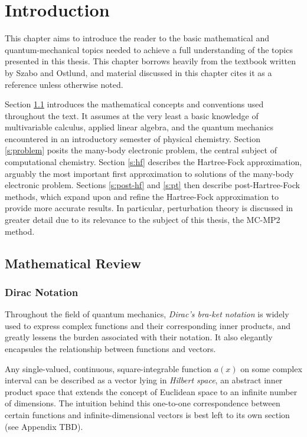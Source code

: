 \chapter{Introduction}

This chapter aims to introduce the reader to the basic mathematical and
quantum-mechanical topics needed to achieve a full understanding of the topics
presented in this thesis. This chapter borrows heavily from the textbook written
by Szabo and Ostlund, and material discussed in this chapter cites it as a
reference unless otherwise noted. \cite{szabo}

Section \ref{s:math} introduces the mathematical concepts and conventions used
throughout the text. It assumes at the very least a basic knowledge of
multivariable calculus, applied linear algebra, and the quantum mechanics
encountered in an introductory semester of physical chemistry. Section
\ref{s:problem} posits the many-body electronic problem, the central subject of
computational chemistry. Section \ref{s:hf} describes the Hartree-Fock
approximation, arguably the most important first approximation to solutions of
the many-body electronic problem. Sections \ref{s:post-hf} and \ref{s:pt} then
describe post-Hartree-Fock methods, which expand upon and refine the
Hartree-Fock approximation to provide more accurate results. In particular,
perturbation theory is discussed in greater detail due to its relevance to the
subject of this thesis, the MC-MP2 method.

\section{Mathematical Review}
\label{s:math}

\subsection{Dirac Notation}

Throughout the field of quantum mechanics, \emph{Dirac's bra-ket notation} is
widely used to express complex functions and their corresponding inner products,
and greatly lessens the burden associated with their notation. It also elegantly
encapsules the relationship between functions and vectors.

Any single-valued, continuous, square-integrable function $a(x)$ on some complex
interval can be described as a vector lying in \emph{Hilbert space}, an abstract
inner product space that extends the concept of Euclidean space to an infinite
number of dimensions. The intuition behind this one-to-one correspondence
between certain functions and infinite-dimensional vectors is best left to its
own section (see Appendix TBD).

